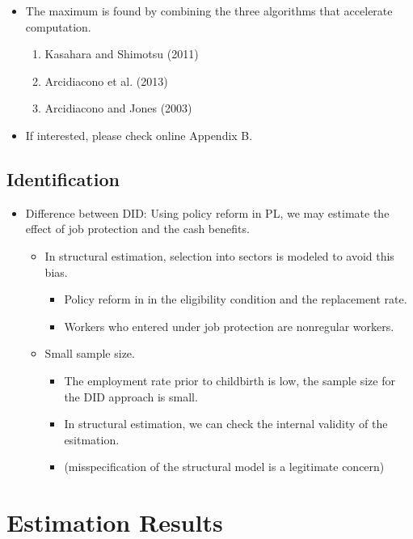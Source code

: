 \documentclass[../root]{subfiles}
\begin{document}
    \begin{itemize}
      \item The maximum is found by combining the three algorithms that accelerate computation.
      \begin{enumerate}
        \item Kasahara and Shimotsu (2011)
        \item Arcidiacono et al. (2013)
        \item Arcidiacono and Jones (2003)
      \end{enumerate}
      \item If interested, please check online Appendix B.
    \end{itemize}

    \subsection{Identification}

    \begin{itemize}
      \item Difference between DID: Using policy reform in PL, we may estimate the effect of job protection and the cash benefits.
      \begin{itemize}
        \item In structural estimation, selection into sectors is modeled to avoid this bias.
        \begin{itemize}
          \item Policy reform in in the eligibility condition and the replacement rate.
          \item Workers who entered under job protection are nonregular workers.
        \end{itemize}
        \item Small sample size.
        \begin{itemize}
          \item The employment rate prior to childbirth is low, the sample size for the DID approach is small.
          \item In structural estimation, we can check the internal validity of the esitmation.
          \item (misspecification of the structural model is a legitimate concern)
        \end{itemize}
      \end{itemize}
    \end{itemize}

    \section{Estimation Results}
\end{document}
